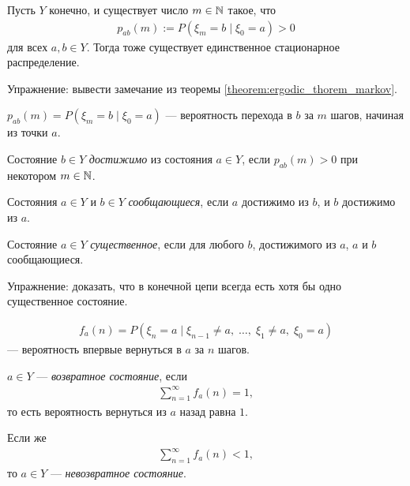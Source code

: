 \documentclass[../main.tex]{subfiles}
\begin{document}
\begin{remrk}
 Пусть $ Y $ конечно, и существует число $ m \in \mathbb{N} $ такое, что
 \begin{align*}
  p_{ab}(m) := P(\xi_m = b \mid \xi_0 = a) > 0
 \end{align*} для всех $ a,b \in Y $. Тогда тоже существует единственное стационарное распределение.
\end{remrk}

Упражнение: вывести замечание из теоремы \ref{theorem:ergodic_thorem_markov}.

\begin{notatn*}
 $ p_{ab}(m) = P(\xi_m = b \mid \xi_0 = a) $ --- вероятность перехода в $ b $ за $ m $ шагов, начиная из точки $ a $.
\end{notatn*}

\begin{df}
 Состояние $ b \in Y $ \textit{достижимо} из состояния $ a \in Y $, если $ p_{ab}(m) > 0 $ при некотором $ m \in \mathbb{N} $.
\end{df}

\begin{df}
 Состояния $ a \in Y $ и $ b \in Y $ \textit{сообщающиеся}, если $ a $ достижимо из $ b $, и $ b $ достижимо из $ a $.
\end{df}

\begin{df}
 Состояние $ a \in Y $ \textit{существенное}, если для любого $ b $, достижимого из $ a $, $ a $ и $ b $ сообщающиеся.
\end{df}

Упражнение: доказать, что в конечной цепи всегда есть хотя бы одно существенное состояние.

\begin{notatn*}
 \begin{align*}
  f_a(n) = P(\xi_n=a\mid \xi_{n-1} \neq a,\; \ldots,\; \xi_1 \neq a,\; \xi_0 = a)
 \end{align*} --- вероятность впервые вернуться в $ a $ за $ n $ шагов.
\end{notatn*}

\begin{df}
 $ a \in Y $ --- \textit{возвратное состояние}, если 
 \begin{align*}
  \sum_{n=1}^{\infty} f_a(n) = 1,
 \end{align*} то есть вероятность вернуться из $ a $ назад равна $ 1 $.

 Если же
 \begin{align*}
  \sum_{n=1}^{\infty} f_a(n) < 1,
 \end{align*} то $ a \in Y $ --- \textit{невозвратное состояние}.
\end{df}
\end{document}
